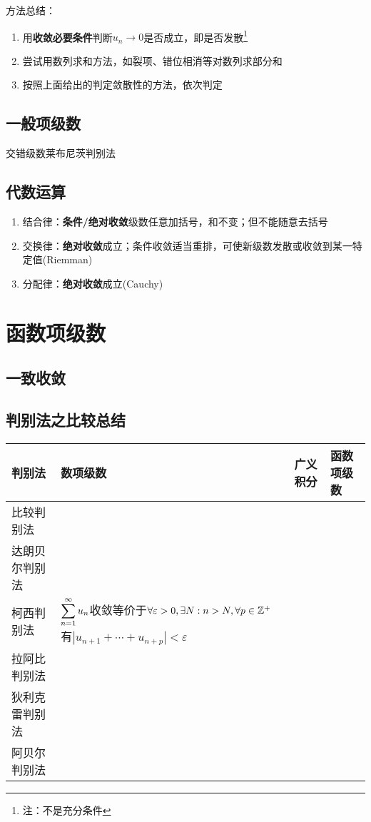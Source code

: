 方法总结：
\begin{enumerate}
	\itemsep -3pt
	\item 用\textbf{收敛必要条件}判断$u_n\to 0$是否成立，即是否发散\footnote{注：不是充分条件}
	\item 尝试用数列求和方法，如裂项、错位相消等对数列求部分和
	\item 按照上面给出的判定敛散性的方法，依次判定
\end{enumerate}

\subsection{一般项级数}
交错级数莱布尼茨判别法

\subsection{代数运算}
\begin{enumerate}
	\item 结合律：\textbf{条件/绝对收敛}级数任意加括号，和不变；但不能随意去括号
	\item 交换律：\textbf{绝对收敛}成立；条件收敛适当重排，可使新级数发散或收敛到某一特定值(Riemman)
	\item 分配律：\textbf{绝对收敛}成立(Cauchy)
\end{enumerate}


\section{函数项级数}
\subsection{一致收敛}

\subsection{判别法之比较总结}
\begin{table}
\centering
\begin{tabular}{|p{4cm}|p{4cm}|p{4cm}|p{4cm}|}
\hline
判别法 & 数项级数 & 广义积分 & 函数项级数\\\hline
比较判别法 & & & \\\hline
达朗贝尔判别法 & & & \\\hline
柯西判别法 & $\displaystyle\sum_{n=1}^{\infty}u_n$收敛等价于$\forall \varepsilon>0,\exists N:n>N,\forall p\in\mathbb{Z}^+$有$|u_{n+1}+\cdots+u_{n+p}|<\varepsilon$ & & \\\hline
拉阿比判别法 & & & \\\hline
狄利克雷判别法 & & & \\\hline
阿贝尔判别法 & & & \\
\hline
\end{tabular}
\end{table}

